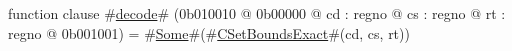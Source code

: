 function clause #\hyperref[zdecode]{decode}# (0b010010 @ 0b00000 @ cd : regno @ cs : regno @ rt : regno @ 0b001001) = #\hyperref[zSome]{Some}#(#\hyperref[zCSetBoundsExact]{CSetBoundsExact}#(cd, cs, rt))
